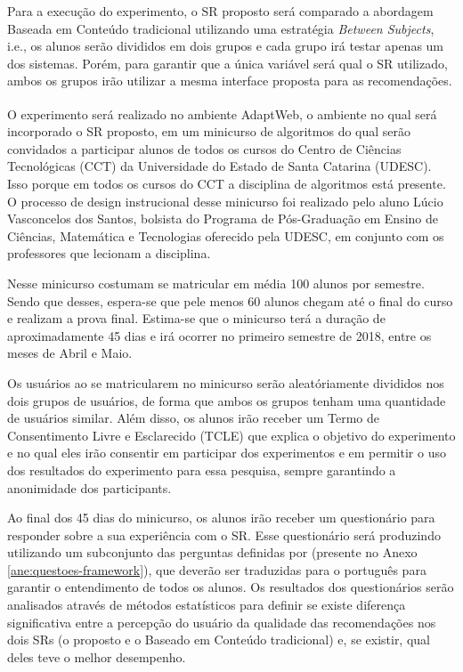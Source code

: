 Para a execução do experimento, o SR proposto será comparado a abordagem Baseada em Conteúdo tradicional utilizando uma
estratégia \textit{Between Subjects}, i.e., os alunos serão divididos em dois grupos e cada grupo irá testar apenas
um dos sistemas. Porém, para garantir que a única variável será qual o SR utilizado, ambos os grupos irão utilizar a mesma
interface proposta para as recomendações.

O experimento será realizado no ambiente AdaptWeb\textsuperscript{\textregistered}, o ambiente no qual será incorporado o
SR proposto, em um minicurso de algoritmos do qual serão convidados a participar alunos de todos os cursos do Centro de
Ciências Tecnológicas (CCT) da Universidade do Estado de Santa Catarina (UDESC). Isso porque em todos os cursos do CCT
a disciplina de algoritmos está presente. O processo de design instrucional desse minicurso foi realizado pelo aluno
Lúcio Vasconcelos dos Santos, bolsista do Programa de Pós-Graduação em Ensino de Ciências, Matemática e Tecnologias
oferecido pela UDESC, em conjunto com os professores que lecionam a disciplina.

Nesse minicurso costumam se matricular em média 100 alunos por semestre. Sendo que desses, espera-se que pele menos 60 alunos chegam até
o final do curso e realizam a prova final. Estima-se que o minicurso terá a duração de aproximadamente 45 dias e irá ocorrer no primeiro semestre
de 2018, entre os meses de Abril e Maio.

Os usuários ao se matricularem no minicurso serão aleatóriamente divididos nos dois grupos de usuários, de forma que ambos
os grupos tenham uma quantidade de usuários similar. Além disso, os alunos irão receber um Termo de Consentimento Livre
e Esclarecido (TCLE) que explica o objetivo do experimento e no qual eles irão consentir em participar dos experimentos e
em permitir o uso dos resultados do experimento para essa pesquisa, sempre garantindo a anonimidade dos participants.

Ao final dos 45 dias do minicurso, os alunos irão receber um questionário para responder sobre a sua experiência com o SR.
Esse questionário será produzindo utilizando um subconjunto das perguntas definidas por  (presente no
Anexo \ref{ane:questoes-framework}), que deverão ser traduzidas para o português para garantir o entendimento de todos os alunos.
Os resultados dos questionários serão  analisados através de métodos estatísticos para definir se existe diferença
significativa entre a percepção do usuário da qualidade das recomendações nos dois SRs (o proposto e o Baseado em Conteúdo tradicional) e, se existir,
qual deles teve o melhor desempenho.

